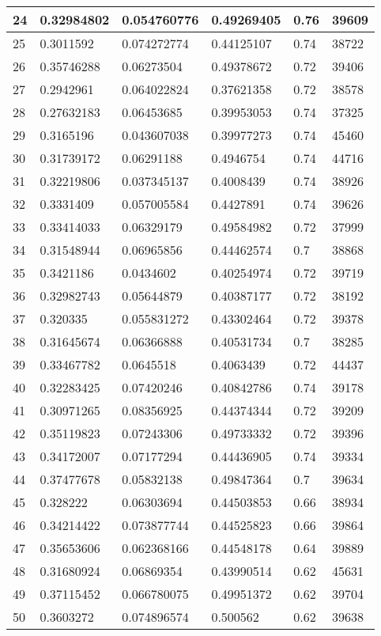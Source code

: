 \begin{longtable}{|l|l|l|l|l|l|}
24 & 0.32984802 & 0.054760776 & 0.49269405 & 0.76 & 39609 \\ \hline 
25 & 0.3011592 & 0.074272774 & 0.44125107 & 0.74 & 38722 \\ \hline 
26 & 0.35746288 & 0.06273504 & 0.49378672 & 0.72 & 39406 \\ \hline 
27 & 0.2942961 & 0.064022824 & 0.37621358 & 0.72 & 38578 \\ \hline 
28 & 0.27632183 & 0.06453685 & 0.39953053 & 0.74 & 37325 \\ \hline 
29 & 0.3165196 & 0.043607038 & 0.39977273 & 0.74 & 45460 \\ \hline 
30 & 0.31739172 & 0.06291188 & 0.4946754 & 0.74 & 44716 \\ \hline 
31 & 0.32219806 & 0.037345137 & 0.4008439 & 0.74 & 38926 \\ \hline 
32 & 0.3331409 & 0.057005584 & 0.4427891 & 0.74 & 39626 \\ \hline 
33 & 0.33414033 & 0.06329179 & 0.49584982 & 0.72 & 37999 \\ \hline 
34 & 0.31548944 & 0.06965856 & 0.44462574 & 0.7 & 38868 \\ \hline 
35 & 0.3421186 & 0.0434602 & 0.40254974 & 0.72 & 39719 \\ \hline 
36 & 0.32982743 & 0.05644879 & 0.40387177 & 0.72 & 38192 \\ \hline 
37 & 0.320335 & 0.055831272 & 0.43302464 & 0.72 & 39378 \\ \hline 
38 & 0.31645674 & 0.06366888 & 0.40531734 & 0.7 & 38285 \\ \hline 
39 & 0.33467782 & 0.0645518 & 0.4063439 & 0.72 & 44437 \\ \hline 
40 & 0.32283425 & 0.07420246 & 0.40842786 & 0.74 & 39178 \\ \hline 
41 & 0.30971265 & 0.08356925 & 0.44374344 & 0.72 & 39209 \\ \hline 
42 & 0.35119823 & 0.07243306 & 0.49733332 & 0.72 & 39396 \\ \hline 
43 & 0.34172007 & 0.07177294 & 0.44436905 & 0.74 & 39334 \\ \hline 
44 & 0.37477678 & 0.05832138 & 0.49847364 & 0.7 & 39634 \\ \hline 
45 & 0.328222 & 0.06303694 & 0.44503853 & 0.66 & 38934 \\ \hline 
46 & 0.34214422 & 0.073877744 & 0.44525823 & 0.66 & 39864 \\ \hline 
47 & 0.35653606 & 0.062368166 & 0.44548178 & 0.64 & 39889 \\ \hline 
48 & 0.31680924 & 0.06869354 & 0.43990514 & 0.62 & 45631 \\ \hline 
49 & 0.37115452 & 0.066780075 & 0.49951372 & 0.62 & 39704 \\ \hline 
50 & 0.3603272 & 0.074896574 & 0.500562 & 0.62 & 39638 \\ \hline 
\end{longtable}